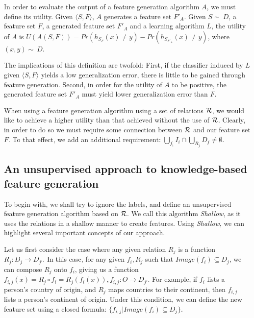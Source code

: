 \documentclass[twoside,11pt]{article}
\theoremstyle{definition}
\begin{document}
In order to evaluate the output of a feature generation algorithm $A$, we must define its utility. Given $\langle S,F \rangle$, $A$ generates a feature set $F'_A$.
Given $S\sim\ D$, a feature set $F$, a generated feature set $F'_A$ and a learning algorithm $L$, the utility of $A$ is $U(A(S,F))=Pr(h_{S_F}(x)\neq y)-Pr(h_{S_{F'_A}}(x)\neq y)$, where $(x,y)\sim\ D$.

The implications of this definition are twofold: First, if the classifier induced by $L$ given  $\langle S,F \rangle$ yields a low generalization error, there is little to be gained through feature generation. Second, in order for the utility of $A$ to be positive, the generated feature set $F'_A$ must yield lower generalization error than $F$.

When using a feature generation algorithm using a set of relations ${\cal R}$, we would like to achieve a higher utility than that achieved without the use of ${\cal R}$. Clearly, in order to do so we must require some connection between ${\cal R}$ and our feature set $F$. To that effect, we add an additional requirement:  $\bigcup_{f_i} I_i \cap \bigcup_{R_j} D_j \neq \emptyset$. 

\subsection{An unsupervised approach to knowledge-based feature generation} \label{shallow_section}

To begin with, we shall try to ignore the labels, and define an unsupervised feature generation algorithm based on ${\cal R}$. We call this algorithm \emph{Shallow}, as it uses the relations in a shallow manner to create features. Using \emph{Shallow}, we can highlight several important concepts of our approach.

Let us first consider the case where any given relation $R_j$ is a function $R_j:D_j\rightarrow D_{j'}$. In this case, for any given $f_i,R_j$ such that 
$Image(f_i) \subseteq D_j$, we can compose $R_j$ onto $f_i$, giving us a function $f_{i,j}(x)=R_j\circ f_i=R_j(f_i(x)),f_{i,j}:O\rightarrow D_{j'}$. For example, if $f_i$ lists a person's country of origin, and $R_j$ maps countries to their continent, then $f_{i,j}$ lists a person's continent of origin.
Under this condition, we can define the new feature set using a closed formula: $\{f_{i,j}|Image(f_i) \subseteq D_j\}$.
\end{document}
